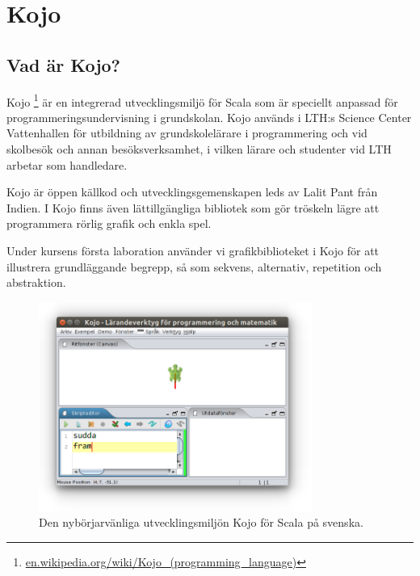 
\chapter{Kojo}\label{appendix:kojo}

\section{Vad är Kojo?}

Kojo%
\footnote{\href{https://en.wikipedia.org/wiki/Kojo_(programming_language)}{en.wikipedia.org/wiki/Kojo\_(programming\_language)}}
 är en integrerad utvecklingsmiljö för Scala som är speciellt anpassad för programmeringsundervisning i grundskolan. Kojo används i LTH:s Science Center Vattenhallen för utbildning av grundskolelärare i programmering och vid skolbesök och annan besöksverksamhet, i vilken lärare och studenter vid LTH arbetar som handledare. 
 
 Kojo är öppen källkod och utvecklingsgemenskapen leds av Lalit Pant från Indien. I Kojo finns även lättillgängliga bibliotek som gör tröskeln lägre att programmera rörlig grafik och enkla spel.

Under kursens första laboration använder vi grafikbiblioteket i Kojo för att illustrera grundläggande begrepp, så som sekvens, alternativ, repetition och abstraktion.  


\begin{figure}[H]
\centering
\includegraphics[width=0.8\textwidth]{../img/kojo/kojo.png}
\caption{Den nybörjarvänliga utvecklingsmiljön Kojo för Scala på svenska.}
\label{fig:appendix:ide:kojo}
\end{figure}

